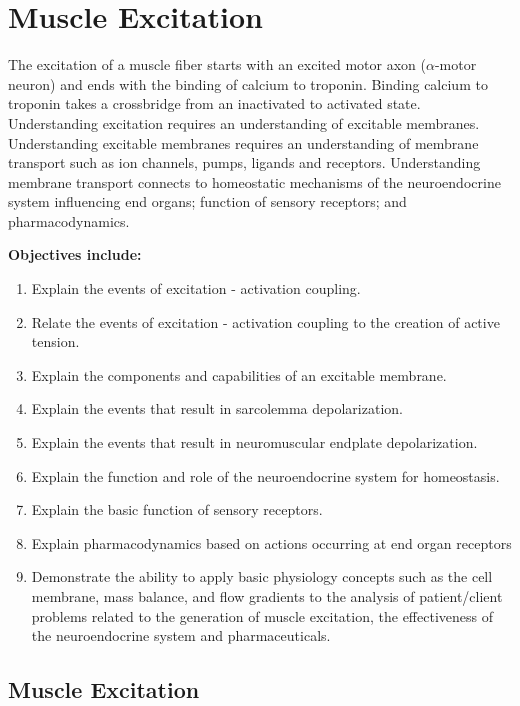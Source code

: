 \chapter{Muscle Excitation}\label{chp:excitation}

\minitoc

The excitation of a muscle fiber starts with an excited motor axon ($\alpha$-motor neuron) and ends with the binding of calcium to troponin. Binding calcium to troponin  takes a crossbridge from an inactivated to activated state. Understanding excitation requires an understanding of excitable membranes. Understanding excitable membranes requires an understanding of membrane transport such as ion channels, pumps, ligands and receptors. Understanding membrane transport connects to homeostatic mechanisms of the neuroendocrine system influencing end organs; function of sensory receptors; and pharmacodynamics.

\vspace{5mm}

\textbf{Objectives include:}
\begin{enumerate}
    \item Explain the events of excitation - activation coupling.
    \item Relate the events of excitation - activation coupling to the creation of active tension.
\item Explain the components and capabilities of an excitable membrane.
    \item Explain the events that result in sarcolemma depolarization.
   \item Explain the events that result in neuromuscular endplate depolarization.
    \item Explain the function and role of the neuroendocrine system for homeostasis.
\item Explain the basic function of sensory receptors.
    \item Explain pharmacodynamics based on actions occurring at end organ receptors
   \item Demonstrate the ability to apply basic physiology concepts such as the cell membrane, mass balance, and flow gradients to the analysis of patient/client problems related to the generation of muscle excitation, the effectiveness of the neuroendocrine system and pharmaceuticals.
\end{enumerate}

\section{Muscle Excitation}
